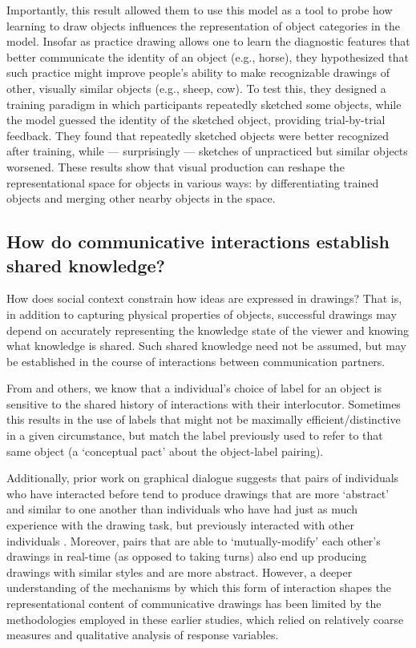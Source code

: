 \documentclass[12pt]{article}
\begin{document}
Importantly, this result allowed them to use this model as a tool to probe how learning to draw objects influences the representation of object categories in the model. Insofar as practice drawing allows one to learn the diagnostic features that better communicate the identity of an object (e.g., horse), they hypothesized that such practice might improve people's ability to make recognizable drawings of other, visually similar objects (e.g., sheep, cow). To test this, they designed a training paradigm in which participants repeatedly sketched some objects, while the model guessed the identity of the sketched object, providing trial-by-trial feedback. They found that repeatedly sketched objects were better recognized after training, while --- surprisingly --- sketches of unpracticed but similar objects worsened. These results show that visual production can reshape the representational space for objects in various ways: by differentiating trained objects and merging other nearby objects in the space.

\subsection{How do communicative interactions establish shared knowledge?}

How does social context constrain how ideas are expressed in drawings? That is, in addition to capturing physical properties of objects, successful drawings may depend on accurately representing the knowledge state of the viewer and knowing what knowledge is shared. Such shared knowledge need not be assumed, but may be established in the course of interactions between communication partners.

From  and others, we know that a individual's choice of label for an object is sensitive to the shared history of interactions with their interlocutor. Sometimes this results in the use of labels that might not be maximally efficient/distinctive in a given circumstance, but match the label previously used to refer to that same object (a ‘conceptual pact’ about the object-label pairing). 

Additionally, prior work on graphical dialogue suggests that pairs of individuals who have interacted before tend to produce drawings that are more `abstract' and similar to one another than individuals who have had just as much experience with the drawing task, but previously interacted with other individuals \cite{Healey:2007vq}. Moreover, pairs that are able to `mutually-modify' each other's drawings in real-time (as opposed to taking turns) also end up producing drawings with similar styles and are more abstract. However, a deeper understanding of the mechanisms by which this form of interaction shapes the representational content of communicative drawings has been limited by the methodologies employed in these earlier studies, which relied on relatively coarse measures and qualitative analysis of response variables. 
\end{document}
